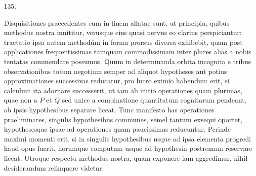 \par{}\medskip
\begin{center}\hypertarget{native-181-article135}{}135.\end{center}
Disquisitiones praecedentes eum in finem allatae sunt, ut principia, quibus
methodus nostra innititur, verusque eius quasi nervus eo clarius perspiciantur:
tractatio ipsa autem method\'um in forma prorsus diversa exhibebit, quam post
applicationes frequentissimas tamquam commodissimam inter plures alias a
nobis tentatas commendare possumus. Quum in determinanda orbita incognita
e tribus observationibus totum negotium semper ad aliquot hypotheses aut
potius approximationes successivas reducatur, pro lucro eximio habendum erit,
si calculum ita adornare successerit, ut iam ab initio operationes quam plurimas,
quae non a $P$ et $Q$ sed unice a combinatione quantitatum cognitarum
pendeant, ab ipsis hypothesibus separare liceat. Tunc manifesto has operationes
praeliminares, singulis hypothesibus communes, semel tantum exsequi
oportet, hypothesesque ipsae ad operationes quam paucissimas reducuntur.
Perinde maximi momenti erit, si in singulis hypothesibus usque ad ipsa elementa
progredi haud opus fuerit, horumque computum usque ad hypothesin
\hypertarget{native-182}{}postremam reservare liceat. Utroque respectu methodus nostra, quam exponere
iam aggredimur, nihil desiderandum relinquere videtur.
